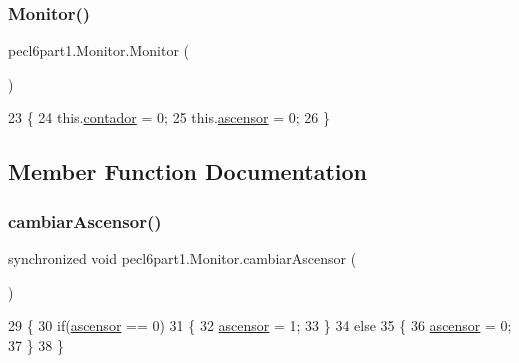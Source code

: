 \subsubsection{\texorpdfstring{Monitor()}{Monitor()}}
{\footnotesize\ttfamily pecl6part1.\+Monitor.\+Monitor (\begin{DoxyParamCaption}{ }\end{DoxyParamCaption})\hspace{0.3cm}{\ttfamily [inline]}}


\begin{DoxyCode}
23     \{
24         this.\mbox{\hyperlink{classpecl6part1_1_1_monitor_aae725b0e0c2cef21ad644a73bc02b777}{contador}} = 0;
25         this.\mbox{\hyperlink{classpecl6part1_1_1_monitor_a6a25fb9f29d59a43156c1c2413d3b5f0}{ascensor}} = 0;
26     \}
\end{DoxyCode}


\subsection{Member Function Documentation}
\mbox{\label{classpecl6part1_1_1_monitor_af73b7d642935a50f59404c7e74e3830a}} 
\subsubsection{\texorpdfstring{cambiar\+Ascensor()}{cambiarAscensor()}}
{\footnotesize\ttfamily synchronized void pecl6part1.\+Monitor.\+cambiar\+Ascensor (\begin{DoxyParamCaption}{ }\end{DoxyParamCaption})\hspace{0.3cm}{\ttfamily [inline]}}


\begin{DoxyCode}
29     \{
30         \textcolor{keywordflow}{if}(\mbox{\hyperlink{classpecl6part1_1_1_monitor_a6a25fb9f29d59a43156c1c2413d3b5f0}{ascensor}} == 0)
31         \{
32             \mbox{\hyperlink{classpecl6part1_1_1_monitor_a6a25fb9f29d59a43156c1c2413d3b5f0}{ascensor}} = 1;
33         \}
34         \textcolor{keywordflow}{else}
35         \{
36             \mbox{\hyperlink{classpecl6part1_1_1_monitor_a6a25fb9f29d59a43156c1c2413d3b5f0}{ascensor}} = 0;
37         \}
38     \}
\end{DoxyCode}
\mbox{\label{classpecl6part1_1_1_monitor_a512e31c5c3891662a9d7dcaa2280afe6}} 

